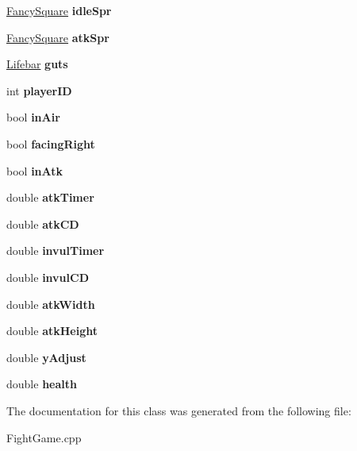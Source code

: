 \begin{DoxyCompactItemize}
\item 
\hypertarget{class_player_af56d931c400cdea7c22e8160093037e3}{}\label{class_player_af56d931c400cdea7c22e8160093037e3} 
\hyperlink{class_fancy_square}{Fancy\+Square} {\bfseries idle\+Spr}
\item 
\hypertarget{class_player_a2541c4c6dc509de5a68752d4e9d43d15}{}\label{class_player_a2541c4c6dc509de5a68752d4e9d43d15} 
\hyperlink{class_fancy_square}{Fancy\+Square} {\bfseries atk\+Spr}
\item 
\hypertarget{class_player_a4c90c45b5567f3ad77ab62b836a4538d}{}\label{class_player_a4c90c45b5567f3ad77ab62b836a4538d} 
\hyperlink{class_lifebar}{Lifebar} {\bfseries guts}
\item 
\hypertarget{class_player_a33c1b79f3bd3885c420d88acee0431f7}{}\label{class_player_a33c1b79f3bd3885c420d88acee0431f7} 
int {\bfseries player\+ID}
\item 
\hypertarget{class_player_aad3727f9bbaeaffc4ba09c7805ad2a09}{}\label{class_player_aad3727f9bbaeaffc4ba09c7805ad2a09} 
bool {\bfseries in\+Air}
\item 
\hypertarget{class_player_a319ddbd239b2114102f0d6e742c6f8b0}{}\label{class_player_a319ddbd239b2114102f0d6e742c6f8b0} 
bool {\bfseries facing\+Right}
\item 
\hypertarget{class_player_a332b68cd95ad6ef4b513f8bfdd416951}{}\label{class_player_a332b68cd95ad6ef4b513f8bfdd416951} 
bool {\bfseries in\+Atk}
\item 
\hypertarget{class_player_a9a1e8db696e64fae86431fd60076c2ea}{}\label{class_player_a9a1e8db696e64fae86431fd60076c2ea} 
double {\bfseries atk\+Timer}
\item 
\hypertarget{class_player_a60d5cfe903e32557ff4847d1409f7cd1}{}\label{class_player_a60d5cfe903e32557ff4847d1409f7cd1} 
double {\bfseries atk\+CD}
\item 
\hypertarget{class_player_a3b5a5fceb2d734ca5816bf509e78ca9d}{}\label{class_player_a3b5a5fceb2d734ca5816bf509e78ca9d} 
double {\bfseries invul\+Timer}
\item 
\hypertarget{class_player_ab2b72a8e3b80192e49d77c79ffdd2d01}{}\label{class_player_ab2b72a8e3b80192e49d77c79ffdd2d01} 
double {\bfseries invul\+CD}
\item 
\hypertarget{class_player_a231c9aa13c1530858d5b16069935a725}{}\label{class_player_a231c9aa13c1530858d5b16069935a725} 
double {\bfseries atk\+Width}
\item 
\hypertarget{class_player_a8787ba98f514093218da0b971c7db8b3}{}\label{class_player_a8787ba98f514093218da0b971c7db8b3} 
double {\bfseries atk\+Height}
\item 
\hypertarget{class_player_a359f983f7b2e401f4d9f35ad24a082b8}{}\label{class_player_a359f983f7b2e401f4d9f35ad24a082b8} 
double {\bfseries y\+Adjust}
\item 
\hypertarget{class_player_aa5b271dcb0c0843a5f5694565bcad3a0}{}\label{class_player_aa5b271dcb0c0843a5f5694565bcad3a0} 
double {\bfseries health}
\end{DoxyCompactItemize}


The documentation for this class was generated from the following file\+:\begin{DoxyCompactItemize}
\item 
Fight\+Game.\+cpp\end{DoxyCompactItemize}
